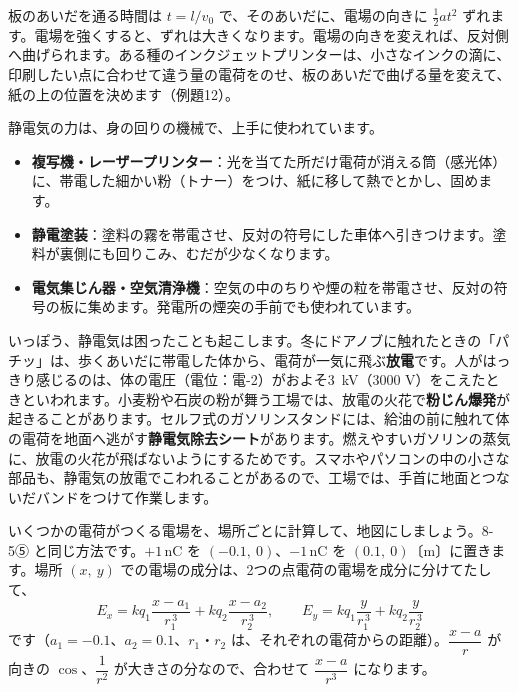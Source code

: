 \noindent 板のあいだを通る時間は $t=l/v_0$ で、そのあいだに、電場の向きに $\tfrac12at^2$ ずれます。電場を強くすると、ずれは大きくなります。電場の向きを変えれば、反対側へ曲げられます。ある種のインクジェットプリンターは、小さなインクの滴に、印刷したい点に合わせて違う量の電荷をのせ、板のあいだで曲げる量を変えて、紙の上の位置を決めます（例題12）。

\begin{phmodel}[一様な電場の中の粒]
\end{phmodel}

\label{ph:電-1:sec9}
静電気の力は、身の回りの機械で、上手に使われています。
\begin{itemize}[leftmargin=1.2\zw, itemsep=2pt, topsep=2pt, label={\color{bkTheme}●}]
\item \textbf{複写機・レーザープリンター}：光を当てた所だけ電荷が消える筒（感光体）に、帯電した細かい粉（トナー）をつけ、紙に移して熱でとかし、固めます。
\item \textbf{静電塗装}：塗料の霧を帯電させ、反対の符号にした車体へ引きつけます。塗料が裏側にも回りこみ、むだが少なくなります。
\item \textbf{電気集じん器・空気清浄機}：空気の中のちりや煙の粒を帯電させ、反対の符号の板に集めます。発電所の煙突の手前でも使われています。
\end{itemize}

\noindent いっぽう、静電気は困ったことも起こします。冬にドアノブに触れたときの「パチッ」は、歩くあいだに帯電した体から、電荷が一気に飛ぶ\textbf{放電}です。人がはっきり感じるのは、体の電圧（電位：電-2）がおよそ\qty{3}{kV}（3000 V）をこえたときといわれます。小麦粉や石炭の粉が舞う工場では、放電の火花で\textbf{粉じん爆発}が起きることがあります。セルフ式のガソリンスタンドには、給油の前に触れて体の電荷を地面へ逃がす\textbf{静電気除去シート}があります。燃えやすいガソリンの蒸気に、放電の火花が飛ばないようにするためです。スマホやパソコンの中の小さな部品も、静電気の放電でこわれることがあるので、工場では、手首に地面とつないだバンドをつけて作業します。

\label{ph:電-1:sec10}
いくつかの電荷がつくる電場を、場所ごとに計算して、地図にしましょう。8-5⑤ と同じ方法です。$+1$\,nC を $(-0.1,\ 0)$、$-1$\,nC を $(0.1,\ 0)$〔m〕に置きます。場所 $(x,\ y)$ での電場の成分は、2つの点電荷の電場を成分に分けてたして、
\[E_x=kq_1\frac{x-a_1}{r_1^{\,3}}+kq_2\frac{x-a_2}{r_2^{\,3}},\qquad E_y=kq_1\frac{y}{r_1^{\,3}}+kq_2\frac{y}{r_2^{\,3}}\]
です（$a_1=-0.1$、$a_2=0.1$、$r_1$・$r_2$ は、それぞれの電荷からの距離）。$\dfrac{x-a}{r}$ が向きの $\cos$、$\dfrac{1}{r^2}$ が大きさの分なので、合わせて $\dfrac{x-a}{r^3}$ になります。


